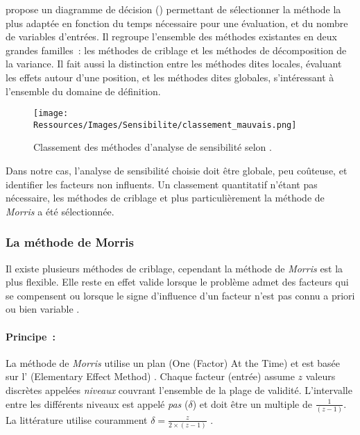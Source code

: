 \textcite{Iooss2011} propose un diagramme de décision ()
permettant de sélectionner la méthode la plus adaptée en fonction du temps nécessaire pour
une évaluation, et du nombre de variables d’entrées. Il regroupe l’ensemble
des méthodes existantes en deux grandes familles~: les méthodes de criblage et les méthodes
de décomposition de la variance. Il fait aussi la distinction entre les
méthodes dites locales, évaluant les effets autour d’une position, et les méthodes
dites globales, s’intéressant à l’ensemble du domaine de définition.

\begin{figure}
    \centering
    \texttt{[image: Ressources/Images/Sensibilite/classement\_mauvais.png]}
    \caption[Classement des méthodes d’analyse de sensibilité selon \cite{Iooss2011}]
            {Classement des méthodes d’analyse de sensibilité selon \cite{Iooss2011}.}
    \label{fig:classement_methode_sensibilite}
\end{figure}

Dans notre cas, l’analyse de sensibilité choisie doit être globale, peu coûteuse,
et identifier les facteurs non influents. Un classement quantitatif n’étant pas
nécessaire, les méthodes de criblage et plus particulièrement la méthode de \textit{Morris}
a été sélectionnée.



\subsubsection{La méthode de Morris} %
\label{ssub:la_methode_de_morris}
Il existe plusieurs méthodes de criblage, cependant la méthode de \textit{Morris} \parencite{Morris1991161}
est la plus flexible. Elle reste en effet valide lorsque le problème admet des facteurs
qui se compensent ou lorsque le signe d’influence d’un facteur n’est pas connu a priori
ou bien variable \parencite{Saltelli2004}.

\paragraph{Principe~:} %
\label{par:principe}
La méthode de \textit{Morris} utilise un plan  (One (Factor) At the Time) et est basée
sur l’ (Elementary Effect Method) \parencite{Saltelli2004}. Chaque facteur
(entrée) assume $z$ valeurs discrètes appelées \textit{niveaux} couvrant l’ensemble de la
plage de validité. L’intervalle entre les différents niveaux est appelé \textit{pas}
($\delta$) et doit être un multiple de $\frac{1}{(z - 1)}$. La littérature utilise
couramment $\delta = \frac{z}{2 \times (z - 1)}$ \parencite{Morris1991161, Campolongo20071509}.

